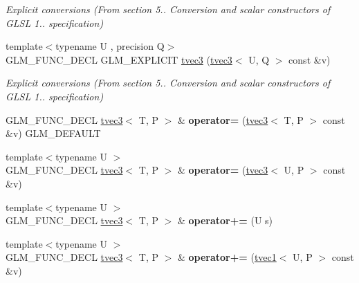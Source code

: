 \begin{DoxyCompactItemize}
\begin{DoxyCompactList}\small\item\em Explicit conversions (From section 5.. Conversion and scalar constructors of G\-L\-S\-L 1.. specification) \end{DoxyCompactList}\item 
\hypertarget{structglm_1_1tvec3_a0c5689584d9f174f88fb0dea6e510adb}{{\footnotesize template$<$typename U , precision Q$>$ }\\G\-L\-M\-\_\-\-F\-U\-N\-C\-\_\-\-D\-E\-C\-L G\-L\-M\-\_\-\-E\-X\-P\-L\-I\-C\-I\-T \hyperlink{structglm_1_1tvec3_a0c5689584d9f174f88fb0dea6e510adb}{tvec3} (\hyperlink{structglm_1_1tvec3}{tvec3}$<$ U, Q $>$ const \&v)}\label{structglm_1_1tvec3_a0c5689584d9f174f88fb0dea6e510adb}

\begin{DoxyCompactList}\small\item\em Explicit conversions (From section 5.. Conversion and scalar constructors of G\-L\-S\-L 1.. specification) \end{DoxyCompactList}\item 
\hypertarget{structglm_1_1tvec3_ad790b1fabd3d2c5e77324f6812be2e1b}{G\-L\-M\-\_\-\-F\-U\-N\-C\-\_\-\-D\-E\-C\-L \hyperlink{structglm_1_1tvec3}{tvec3}$<$ T, P $>$ \& {\bfseries operator=} (\hyperlink{structglm_1_1tvec3}{tvec3}$<$ T, P $>$ const \&v) G\-L\-M\-\_\-\-D\-E\-F\-A\-U\-L\-T}\label{structglm_1_1tvec3_ad790b1fabd3d2c5e77324f6812be2e1b}

\item 
\hypertarget{structglm_1_1tvec3_aff4967c521c4bc8f009eed5db29c9406}{{\footnotesize template$<$typename U $>$ }\\G\-L\-M\-\_\-\-F\-U\-N\-C\-\_\-\-D\-E\-C\-L \hyperlink{structglm_1_1tvec3}{tvec3}$<$ T, P $>$ \& {\bfseries operator=} (\hyperlink{structglm_1_1tvec3}{tvec3}$<$ U, P $>$ const \&v)}\label{structglm_1_1tvec3_aff4967c521c4bc8f009eed5db29c9406}

\item 
\hypertarget{structglm_1_1tvec3_a0a1be09c4b4abe2d89d83c9ed6199abd}{{\footnotesize template$<$typename U $>$ }\\G\-L\-M\-\_\-\-F\-U\-N\-C\-\_\-\-D\-E\-C\-L \hyperlink{structglm_1_1tvec3}{tvec3}$<$ T, P $>$ \& {\bfseries operator+=} (U s)}\label{structglm_1_1tvec3_a0a1be09c4b4abe2d89d83c9ed6199abd}

\item 
\hypertarget{structglm_1_1tvec3_acfd1571d1fab5431b44fdad4d63f3134}{{\footnotesize template$<$typename U $>$ }\\G\-L\-M\-\_\-\-F\-U\-N\-C\-\_\-\-D\-E\-C\-L \hyperlink{structglm_1_1tvec3}{tvec3}$<$ T, P $>$ \& {\bfseries operator+=} (\hyperlink{structglm_1_1tvec1}{tvec1}$<$ U, P $>$ const \&v)}\label{structglm_1_1tvec3_acfd1571d1fab5431b44fdad4d63f3134}


\end{DoxyCompactItemize}
